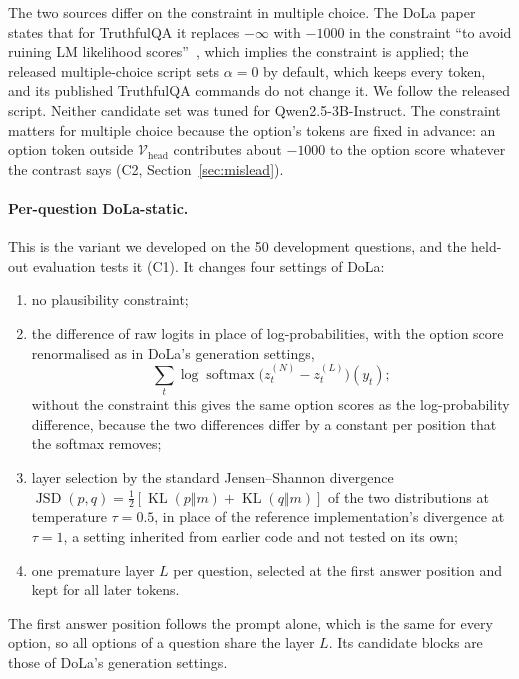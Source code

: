 \documentclass[11pt]{article}
\newcommand{\cha}[1]{\textsf{C#1}}
\newcommand{\Method}{Per-question DoLa-static}
\newcommand{\mainmodel}{Qwen2.5-3B-Instruct}
\newcommand{\JSD}{\operatorname{JSD}}
\newcommand{\KL}{\operatorname{KL}}
\newcommand{\Vhead}{\mathcal{V}_{\mathrm{head}}}
\begin{document}
The two sources differ on the constraint in multiple choice. The DoLa paper states that for TruthfulQA it replaces
$-\infty$ with $-1000$ in the constraint ``to avoid ruining LM likelihood scores''~\citep{chuang2024dola}, which
implies the constraint is applied; the released multiple-choice script sets $\alpha = 0$ by default, which keeps
every token, and its published TruthfulQA commands do not change it. We follow the released script.
Neither candidate set was tuned for \mainmodel{}. The constraint matters for multiple choice because the option's
tokens are fixed in advance: an option token outside $\Vhead$ contributes about $-1000$ to the option score
whatever the contrast says (\cha2, Section~\ref{sec:mislead}).

\paragraph{\Method{}.}
This is the variant we developed on the 50 development questions, and the held-out evaluation tests it
(\cha1). It changes four settings of DoLa:
\begin{enumerate}
\item no plausibility constraint;
\item the difference of raw logits in place of log-probabilities, with the option score renormalised as in DoLa's
  generation settings,
  \[ \textstyle \sum_t \log \operatorname{softmax}\bigl(z^{(N)}_t - z^{(L)}_t\bigr)(y_t); \]
  without the constraint this gives the same option scores as the log-probability difference, because the two
  differences differ by a constant per position that the softmax removes;
\item layer selection by the standard Jensen--Shannon divergence $\JSD(p, q) = \tfrac12[\KL(p \Vert m) + \KL(q
  \Vert m)]$ of the two distributions at temperature $\tau = 0.5$, in place of the reference implementation's
  divergence at $\tau = 1$, a setting inherited from earlier code and not tested on its own;
\item one premature layer $L$ per question, selected at the first answer position and kept for all later tokens.
\end{enumerate}
The first answer position follows the prompt alone, which is the same for every option, so all options of a
question share the layer $L$. Its candidate blocks are those of DoLa's generation settings.
\end{document}
